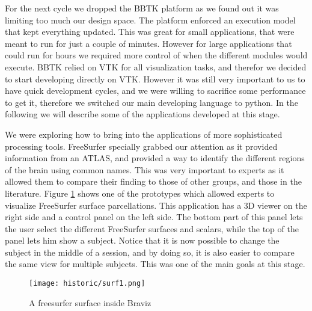 For the next cycle we dropped the BBTK platform as we found out it was limiting too much our design space. The platform enforced an execution model that kept everything updated. This was great for small applications, that were meant to run for just a couple of minutes. However for large applications that could run for hours we required more control of when the different modules would execute. BBTK relied on VTK for all visualization tasks, and therefor we decided to start developing directly on VTK. However it was still very important to us to have quick development cycles, and we were willing to sacrifice some performance to get it, therefore we switched our main developing language to python. In the following we will describe some of the applications developed at this stage. 

We were exploring how to bring into the applications of more sophisticated processing tools. FreeSurfer specially grabbed our attention as it provided information from an ATLAS, and provided a way to identify the different regions of the brain using common names. This was very important to experts as it allowed them to compare their finding to those of other groups, and those in the literature. Figure \ref{fig_surf_1} shows one of the prototypes which allowed experts to visualize FreeSurfer surface parcellations. This application has a 3D viewer on the right side and a control panel on the left side. The bottom part of this panel lets the user select the different FreeSurfer surfaces and scalars, while the top of the panel lets him show a subject. Notice that it is now possible to change the subject in the middle of a session, and by doing so, it is also easier to compare the same view for multiple subjects. This was one of the main goals at this stage. 

\begin{figure}
\centering
\texttt{[image: historic/surf1.png]} 
\caption{\label{fig_surf_1}A freesurfer surface inside Braviz}
\end{figure}

